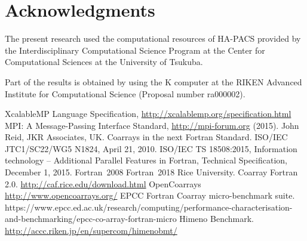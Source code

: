 \documentclass[graybox]{svmult}
\begin{document}
\section*{Acknowledgments}
                                   
The present research used the computational resources of HA-PACS provided by the 
Interdisciplinary Computational Science Program at the Center for 
Computational Sciences at the University of Tsukuba. 

Part of the results is obtained by using the K computer at the RIKEN Advanced 
Institute for Computational Science (Proposal number ra000002). 




\begin{thebibliography}{99}
  XcalableMP Language Specification, \url{http://xcalablemp.org/specification.html}
  MPI: A Message-Passing Interface Standard, \url{http://mpi-forum.org} (2015).
  John Reid, JKR Associates, UK. Coarrays in the next Fortran Standard.
    ISO/IEC JTC1/SC22/WG5 N1824, April 21, 2010.
  ISO/IEC TS 18508:2015, Information technology -- Additional Parallel 
    Features in Fortran, Technical Specification, December 1, 2015.
  Fortran~2008
  Fortran~2018
  Rice University. Coarray Fortran 2.0. \url{http://caf.rice.edu/download.html}
  OpenCoarrays \url{http://www.opencoarrays.org/}
  EPCC Fortran Coarray micro-benchmark suite. 
    https://www.epcc.ed.ac.uk/research/computing/performance-characterisation-and-benchmarking/epcc-co-array-fortran-micro
  Himeno Benchmark. \url{http://accc.riken.jp/en/supercom/himenobmt/}

\end{thebibliography}
\end{document}
